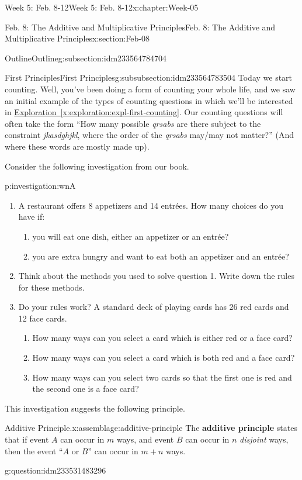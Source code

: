 \documentclass[oneside,10pt,]{book}
\newcommand{\xreffont}{\relax}
\newcommand{\terminology}[1]{\textbf{#1}}
\numberwithin{equation}{section}
\begin{document}
\begin{chapterptx}{Week 5: Feb. 8-12}{}{Week 5: Feb. 8-12}{}{}{x:chapter:Week-05}
\begin{sectionptx}{Feb. 8: The Additive and Multiplicative Principles}{}{Feb. 8: The Additive and Multiplicative Principles}{}{}{x:section:Feb-08}
\begin{subsectionptx}{Outline}{}{Outline}{}{}{g:subsection:idm233564784704}
\begin{subsubsectionptx}{First Principles}{}{First Principles}{}{}{g:subsubsection:idm233564783504}
Today we start counting. Well, you've been doing a form of counting your whole life, and we saw an initial example of the types of counting questions in which we'll be interested in \hyperref[x:exploration:expl-first-counting]{Exploration~{\xreffont\ref{x:exploration:expl-first-counting}}}. Our counting questions will often take the form ``How many possible \emph{qrsabs} are there subject to the constraint \emph{jkasdghjkl}, where the order of the \emph{qrsabs} may\slash{}may not matter?'' (And where these words are mostly made up).%
\par
Consider the following investigation from our book.%
\begin{investigation}{}{p:investigation:wnA}%
%
\begin{enumerate}
\item{}A restaurant offers 8 appetizers and 14 entrées. How many choices do you have if:%
\begin{enumerate}
\item{}you will eat one dish, either an appetizer or an entrée?%
\item{}you are extra hungry and want to eat both an appetizer and an entrée?%
\end{enumerate}
%
\item{}Think about the methods you used to solve question 1. Write down the rules for these methods.%
\item{}Do your rules work? A standard deck of playing cards has 26 red cards and 12 face cards.%
\begin{enumerate}
\item{}How many ways can you select a card which is either red or a face card?%
\item{}How many ways can you select a card which is both red and a face card?%
\item{}How many ways can you select two cards so that the first one is red and the second one is a face card?%
\end{enumerate}
%
\end{enumerate}
%
\end{investigation}%
This investigation suggests the following principle.%
\begin{assemblage}{Additive Principle.}{x:assemblage:additive-principle}%
The \terminology{additive principle} states that if event \(A\) can occur in \(m\) ways, and event \(B\) can occur in \(n\) \emph{disjoint} ways, then the event ``\(A\) or \(B\)'' can occur in \(m + n\) ways.%
\end{assemblage}
\begin{question}{}{g:question:idm233531483296}%

\end{question}
\end{subsubsectionptx}
\end{subsectionptx}
\end{sectionptx}
\end{chapterptx}
\end{document}
